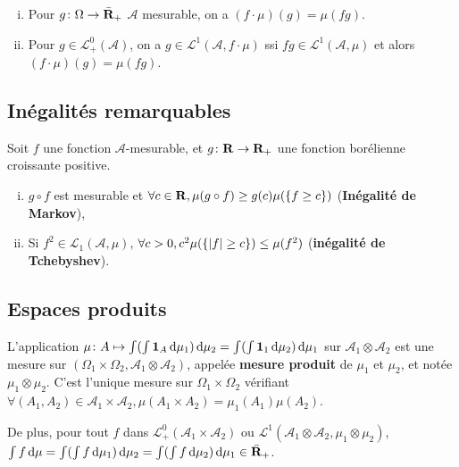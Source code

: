 	\begin{thm}
		\begin{enumerate}[(i)]
			\item Pour $g \colon \Omega \to \Bar{\mathbf{R}}_+$ $\mathcal{A}$ mesurable, on a $(f \cdot \mu)(g) = \mu(fg)$.
			\item Pour $g \in \mathcal{L}_+^0(\mathcal{A})$, on a $g \in \mathcal{L}^1(\mathcal{A}, f \cdot \mu)$ ssi $fg \in \mathcal{L}^1(\mathcal{A}, \mu)$ et alors $(f \cdot \mu)(g) = \mu(fg)$.
		\end{enumerate}
	\end{thm}


\subsection{Inégalités remarquables}

	\begin{thm}
		Soit $f$ une fonction $\mathcal{A}$-mesurable, et $g \colon \mathbf{R} \to \mathbf{R}_+$ une fonction borélienne croissante positive.
		\begin{enumerate}[(i)]
			\item $g \circ f$ est mesurable et $\forall c \in \mathbf{R}, \mu(g \circ f) \geq g(c) \mu(\{ f \geq c \})$ (\textbf{Inégalité de Markov}),
			\item Si $f^2 \in \mathcal{L}_1(\mathcal{A},\mu)$, $\forall c > 0, c^2 \mu(\{ \left\lvert f\right\rvert \geq c \}) \leq \mu(f^2)$ (\textbf{inégalité de Tchebyshev}).
		\end{enumerate}
	\end{thm}


\subsection{Espaces produits}

	\begin{thm}
		L'application $\mu \colon A \mapsto \int (\int \operatorname{\mathbf{1}}_A \mathop{}\mathopen{}\mathrm{d} \mu_1) \mathop{}\mathopen{}\mathrm{d} \mu_2 = \int (\int \operatorname{\mathbf{1}}_1 \mathop{}\mathopen{}\mathrm{d} \mu_2) \mathop{}\mathopen{}\mathrm{d} \mu_1$ sur $\mathcal{A}_1 \otimes \mathcal{A}_2$ est une mesure sur $(\Omega_1 \times \Omega_2, \mathcal{A}_1 \otimes \mathcal{A}_2)$, appelée \textbf{mesure produit} de $\mu_1$ et $\mu_2$, et notée $\mu_1 \otimes \mu_2$.
		C'est l'unique mesure sur $\Omega_1 \times \Omega_2$ vérifiant $\forall (A_1, A_2) \in \mathcal{A}_1 \times \mathcal{A}_2, \mu(A_1 \times A_2) = \mu_1(A_1) \mu(A_2)$.
		
		De plus, pour tout $f$ dans $\mathcal{L}^0_+(\mathcal{A}_1 \times \mathcal{A}_2)$ ou $\mathcal{L}^1(\mathcal{A}_1 \otimes \mathcal{A}_2, \mu_1 \otimes \mu_2)$, $\int f \mathop{}\mathopen{}\mathrm{d} \mu = \int (\int f \mathop{}\mathopen{}\mathrm{d} \mu_1) \mathop{}\mathopen{}\mathrm{d} \mu_2 = \int(\int f \mathop{}\mathopen{}\mathrm{d} \mu_2) \mathop{}\mathopen{}\mathrm{d} \mu_1 \in \Bar{\mathbf{R}}_+$.
	\end{thm}

